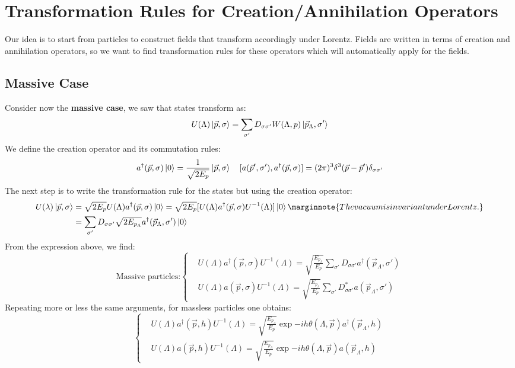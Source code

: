 \documentclass[../main.tex]{subfiles}
\begin{document}
\section{Transformation Rules for Creation/Annihilation Operators}
Our idea is to start from particles to construct fields that transform accordingly under Lorentz. Fields are written in terms of creation and annihilation operators, so we want to find transformation rules for these operators which will automatically apply for the fields.\\
\subsection{Massive Case}
Consider now the \textbf{massive case}, we saw that states transform as:
\[
U(\Lambda)\ket{\vec{p},\sigma}=\sum_{\sigma'}D_{\sigma\sigma'}W(\Lambda,p)\ket{\vec{p}_\Lambda,\sigma'}
\]
We define the creation operator and its commutation rules:
\[
a^\dagger(\vec{p},\sigma)\ket{0}=\frac{1}{\sqrt{2E_p}}\ket{\vec{p},\sigma} \quad [a(\vec{p}',\sigma'),a^\dagger(\vec{p},\sigma)]=(2\pi)^3\delta^3(\vec{p}-\vec{p}')\delta_{\sigma\sigma'}
\]
The next step is to write the transformation rule for the states but using the creation operator:
\begin{align*}
U(\lambda)\ket{\vec{p},\sigma}&=\sqrt{2E_p}U(\Lambda)a^\dagger(\vec{p},\sigma)\ket{0}=\sqrt{2E_p}[U(\Lambda)a^\dagger(\vec{p},\sigma)U^{-1}(\Lambda)]\ket{0}\marginnote{The vacuum is invariant under Lorentz.}\\
&=\sum_{\sigma'}D_{\sigma\sigma'}\sqrt{2E_{p_\Lambda}}a^\dagger(\vec{p}_\Lambda,\sigma')\ket{0}
\end{align*}
From the expression above, we find:
\[
\text{Massive particles:}
\left\{
\begin{aligned}
&U(\Lambda)a^\dagger(\vec{p},\sigma)U^{-1}(\Lambda)=\sqrt{\frac{E_{p_\Lambda}}{E_p}}\sum_{\sigma'}D_{\sigma\sigma'}a^\dagger(\vec{p}_\Lambda,\sigma')\\
&U(\Lambda)a(\vec{p},\sigma)U^{-1}(\Lambda)=\sqrt{\frac{E_{p_\Lambda}}{E_p}}\sum_{\sigma'}D_{\sigma\sigma'}^*a(\vec{p}_\Lambda,\sigma')
\end{aligned}
\right.
\]
Repeating more or less the same arguments, for massless particles one obtains:
\[
\left\{
\begin{aligned}
&U(\Lambda)a^\dagger(\vec{p},h)U^{-1}(\Lambda)=\sqrt{\frac{E_{p_\Lambda}}{E_p}}\exp{-ih\theta(\Lambda,\vec{p})}a^\dagger(\vec{p}_\Lambda,h)\\
&U(\Lambda)a(\vec{p},h)U^{-1}(\Lambda)=\sqrt{\frac{E_{p_\Lambda}}{E_p}}\exp{-ih\theta(\Lambda,\vec{p})}a(\vec{p}_\Lambda,h)
\end{aligned}
\right.
\]
\end{document}
